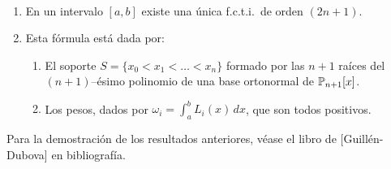\begin{theorem}~
  \begin{enumerate}
  \item En un intervalo $[a,b]$ existe una única f.c.t.i.\ de orden $(2n+1)$.
  \item Esta fórmula está dada por:
    \begin{enumerate}
    \item El soporte $S=\{x_0<x_1<\dots<x_n\}$ formado por las $n+1$
      raíces del $(n+1)$--ésimo polinomio de una base
      ortonormal de $\operatorname{{\mathbb P}}_{n+1}[x]$.
    \item Los pesos, dados por $\omega_i=\int_a^b L_i(x)\, dx$, que son
      todos positivos.
    \end{enumerate}
  \end{enumerate}
\end{theorem}

Para la demostración de los resultados anteriores, véase el libro de
[Guillén-Dubova] en bibliografía.





